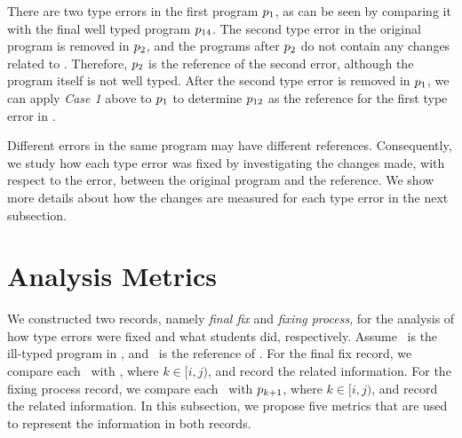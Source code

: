 \documentclass[12pt]{report}	%
\begin{document}
There are two type errors in the first program
$p\textsubscript{1}$, as can be seen by comparing it
with the final 
well typed program $p\textsubscript{14}$.
%
%
%
The second type error in the original program is removed in $p\textsubscript{2}$,
and the programs after $p\textsubscript{2}$ do not contain any changes 
related to .
Therefore, $p\textsubscript{2}$ is the reference of the second error,
although the program itself is not well typed.
%
%
After the second type error is removed in 
$p\textsubscript{1}$, we can apply \textit{Case 1} above
to $p\textsubscript{1}$ to determine $p\textsubscript{12}$
as the reference 
for the first type
error in .

Different errors in the same program may have different references.
Consequently, we study how each type error was fixed by investigating
the changes made, with respect to the error, between the original program
and the reference. We show more details about how the changes are measured
for each type error in the next subsection.

\section{Analysis Metrics}
\label{sec:subject:metric}

We constructed two records,
namely \emph{final fix} and \emph{fixing process},
for the analysis of how type errors were fixed and what students did, respectively.
Assume \pgi\ is the ill-typed program in \seqij, and \pgj\
is the reference of \pgi.
For the final fix record, we compare each \pgk\ with \pgj, where $k \in [i,j)$, 
and record the related information.
For the fixing process record, we compare each \pgk\ with $p_{k+1}$,
where $k \in [i,j)$, and record the related information.
In this subsection, we propose five metrics that
are used to represent the information in both records.
\end{document}
